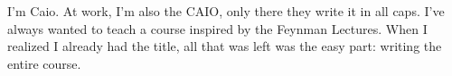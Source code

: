 
I'm Caio. At work, I'm also the CAIO, only there they write it in all caps. I've always wanted to teach a course inspired by the Feynman Lectures. When I realized I already had the title, all that was left was the easy part: writing the entire course.
